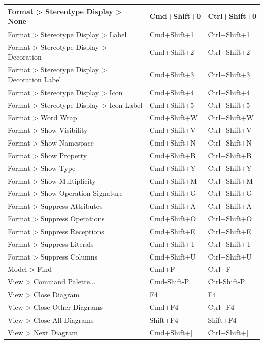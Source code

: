 \documentclass[a4paper,12pt]{extreport}
\begin{document}
\begin{longtable}{|l|l|l|}
			Format > Stereotype Display > None & Cmd+Shift+0 & Ctrl+Shift+0 \\ \hline
			Format > Stereotype Display > Label & Cmd+Shift+1 & Ctrl+Shift+1 \\ \hline
			Format > Stereotype Display > Decoration & Cmd+Shift+2 & Ctrl+Shift+2 \\ \hline
			Format > Stereotype Display > Decoration Label & Cmd+Shift+3 & Ctrl+Shift+3 \\ \hline
			Format > Stereotype Display > Icon & Cmd+Shift+4 & Ctrl+Shift+4 \\ \hline
			Format > Stereotype Display > Icon Label & Cmd+Shift+5 & Ctrl+Shift+5 \\ \hline
			Format > Word Wrap & Cmd+Shift+W & Ctrl+Shift+W \\ \hline
			Format > Show Visibility & Cmd+Shift+V & Ctrl+Shift+V \\ \hline
			Format > Show Namespace & Cmd+Shift+N & Ctrl+Shift+N \\ \hline
			Format > Show Property & Cmd+Shift+B & Ctrl+Shift+B \\ \hline
			Format > Show Type & Cmd+Shift+Y & Ctrl+Shift+Y \\ \hline
			Format > Show Multiplicity & Cmd+Shift+M & Ctrl+Shift+M \\ \hline
			Format > Show Operation Signature & Cmd+Shift+G & Ctrl+Shift+G \\ \hline
			Format > Suppress Attributes & Cmd+Shift+A & Ctrl+Shift+A \\ \hline
			Format > Suppress Operations & Cmd+Shift+O & Ctrl+Shift+O \\ \hline
			Format > Suppress Receptions & Cmd+Shift+E & Ctrl+Shift+E \\ \hline
			Format > Suppress Literals & Cmd+Shift+T & Ctrl+Shift+T \\ \hline
			Format > Suppress Columns & Cmd+Shift+U & Ctrl+Shift+U \\ \hline
			Model > Find & Cmd+F & Ctrl+F \\ \hline
			View > Command Palette... & Cmd-Shift-P & Ctrl-Shift-P \\ \hline
			View > Close Diagram & F4 & F4 \\ \hline
			View > Close Other Diagrams & Cmd+F4 & Ctrl+F4 \\ \hline
			View > Close All Diagrams & Shift+F4 & Shift+F4 \\ \hline
			View > Next Diagram & Cmd+Shift+] & Ctrl+Shift+] \\ \hline

\end{longtable}
\end{document}
